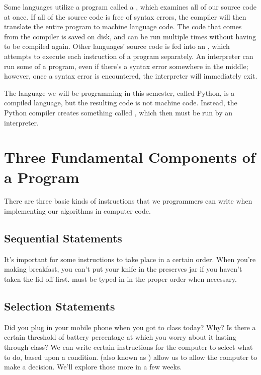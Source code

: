 Some languages utilize a program called a , which examines all of our source code at once.  If all of the source code is free of syntax errors, the compiler will then translate the entire program to machine language code.  The code that comes from the compiler is saved on disk, and can be run multiple times without having to be compiled again.  Other languages' source code is fed into an , which attempts to execute each instruction of a program separately.  An interpreter can run some of a program, even if there's a syntax error somewhere in the middle; however, once a syntax error is encountered, the interpreter will immediately exit.

The language we will be programming in this semester, called Python, is a compiled language, but the resulting code is not machine code.  Instead, the Python compiler creates something called , which then must be run by an interpreter.

\section{Three Fundamental Components of a Program}
\label{sec:threekinds}

There are three basic kinds of instructions that we programmers can write when implementing our algorithms in computer code.

\subsection{Sequential Statements}

It's important for some instructions to take place in a certain order.  When you're making breakfast, you can't put your knife in the preserves jar if you haven't taken the lid off first.   must be typed in in the proper order when necessary.

\subsection{Selection Statements}

Did you plug in your mobile phone when you got to class today?  Why?  Is there a certain threshold of battery percentage at which you worry about it lasting through class?  We can write certain instructions for the computer to select what to do, based upon a condition.   (also known as ) allow us to allow the computer to make a decision.  We'll explore those more in a few weeks.  

